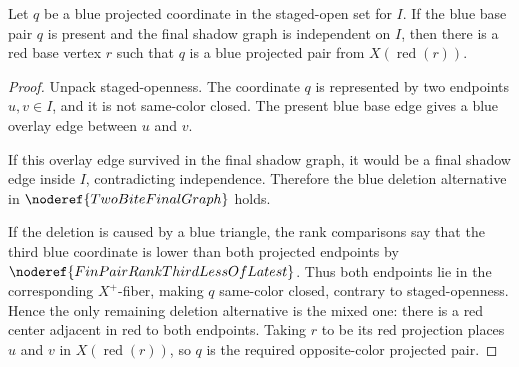 \begin{lemma}
Let \(q\) be a blue projected coordinate in the staged-open set for \(I\).
If the blue base pair \(q\) is present and the final shadow graph is
independent on \(I\), then there is a red base vertex \(r\) such that
\(q\) is a blue projected pair from
\(X(\operatorname{red}(r))\).
\end{lemma}
\begin{proof}
Unpack staged-openness. The coordinate \(q\) is represented by two
endpoints \(u,v\in I\), and it is not same-color closed. The present blue
base edge gives a blue overlay edge between \(u\) and \(v\).

If this overlay edge survived in the final shadow graph, it would be a
final shadow edge inside \(I\), contradicting independence. Therefore the
blue deletion alternative in \(\noderef{TwoBiteFinalGraph}\) holds.

If the deletion is caused by a blue triangle, the rank comparisons say that
the third blue coordinate is lower than both projected endpoints by
\(\noderef{FinPairRankThirdLessOfLatest}\). Thus both endpoints lie in the
corresponding \(X^+\)-fiber, making \(q\) same-color closed, contrary to
staged-openness. Hence the only remaining deletion alternative is the
mixed one: there is a red center adjacent in red to both endpoints.
Taking \(r\) to be its red projection places \(u\) and \(v\) in
\(X(\operatorname{red}(r))\), so \(q\) is the required opposite-color
projected pair.
\end{proof}
